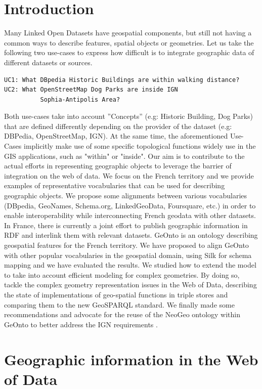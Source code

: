 \documentclass[a4paper,11pt]{report}
\begin{document}
\section{Introduction}
 Many Linked Open Datasets have geospatial components, but still not having a common ways to describe features, spatial objects or geometries. Let us take the following two use-cases to express how difficult is to integrate geographic data of different datasets or sources. 
\begin{verbatim}
UC1: What DBpedia Historic Buildings are within walking distance?
UC2: What OpenStreetMap Dog Parks are inside IGN
          Sophia-Antipolis Area?
\end{verbatim} 
 Both use-cases take into account ''Concepts'' (e.g: Historic Building, Dog Parks) that are defined differently depending on the provider of the dataset (e.g: DBPedia, OpenStreetMap, IGN). At the same time, the aforementioned Use-Cases implicitly make use of some specific topological functions widely use in the GIS applications, such as "within" or "inside". Our aim is to contribute to the actual efforts in representing geographic objects to leverage the barrier of integration on the web of data. We focus on the French territory and we provide examples of representative vocabularies that can be used for describing geographic objects. We propose some alignments between various vocabularies (DBpedia, GeoNames, Schema.org, LinkedGeoData, Foursquare, etc.) in order to enable interoperability while interconnecting French geodata with other datasets. In France, there is  currently a joint effort to publish geographic information in RDF  and interlink them with relevant datasets. GeOnto is an ontology describing geospatial features for the French territory. We have proposed to align GeOnto with other popular vocabularies in the geospatial domain, using Silk for schema mapping and we have evaluated the results. We studied how to extend the model to take into account efficient modeling for complex geometries. By doing so, tackle the complex geometry representation issues in the Web of Data, describing the state of implementations of geo-spatial functions in triple stores and comparing them to the new GeoSPARQL standard.  We finally made some recommendations and advocate for the reuse of the NeoGeo ontology within GeOnto to better address the IGN requirements \cite{atemezing2012b}.


\section{Geographic information in the Web of Data}                         \label{sec:geo-in-web-of-data}
\end{document}
